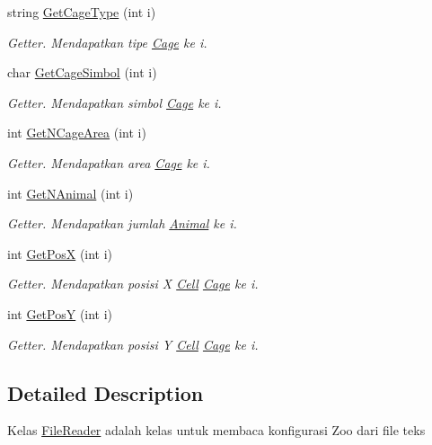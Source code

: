 \begin{DoxyCompactItemize}
string \hyperlink{classFileReader_ab554f5ac48f82074f2718734bb8bcd82}{Get\-Cage\-Type} (int i)
\begin{DoxyCompactList}\small\item\em Getter. Mendapatkan tipe \hyperlink{classCage}{Cage} ke i. \end{DoxyCompactList}\item 
char \hyperlink{classFileReader_a085e4b6522e3a234a96891a74710e774}{Get\-Cage\-Simbol} (int i)
\begin{DoxyCompactList}\small\item\em Getter. Mendapatkan simbol \hyperlink{classCage}{Cage} ke i. \end{DoxyCompactList}\item 
int \hyperlink{classFileReader_a0e021e7e89ab6a788573791c409ae63e}{Get\-N\-Cage\-Area} (int i)
\begin{DoxyCompactList}\small\item\em Getter. Mendapatkan area \hyperlink{classCage}{Cage} ke i. \end{DoxyCompactList}\item 
int \hyperlink{classFileReader_a28187c28f4713125f55a928cbd7a9ce5}{Get\-N\-Animal} (int i)
\begin{DoxyCompactList}\small\item\em Getter. Mendapatkan jumlah \hyperlink{classAnimal}{Animal} ke i. \end{DoxyCompactList}\item 
int \hyperlink{classFileReader_a6739708d4e85ef4c8b9436178518f287}{Get\-Pos\-X} (int i)
\begin{DoxyCompactList}\small\item\em Getter. Mendapatkan posisi X \hyperlink{classCell}{Cell} \hyperlink{classCage}{Cage} ke i. \end{DoxyCompactList}\item 
int \hyperlink{classFileReader_a76fdd51b22001d088f55d1722668b455}{Get\-Pos\-Y} (int i)
\begin{DoxyCompactList}\small\item\em Getter. Mendapatkan posisi Y \hyperlink{classCell}{Cell} \hyperlink{classCage}{Cage} ke i. \end{DoxyCompactList}\end{DoxyCompactItemize}


\subsection{Detailed Description}
Kelas \hyperlink{classFileReader}{File\-Reader} adalah kelas untuk membaca konfigurasi Zoo dari file teks 

